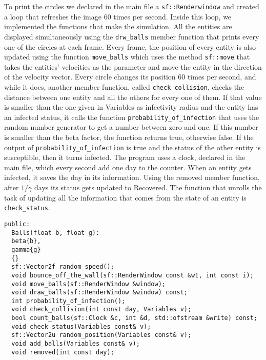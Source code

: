   To print the circles we declared in the main file a \verb|sf::Renderwindow| and created a loop that refreshes the image 60 times per second. Inside this loop, we implemented the functions that make the simulation. All the entities are displayed simultaneously using the \verb|drw_balls| member function that prints every one of the circles at each frame.
  Every frame, the position of every entity is also updated using the function \verb|move_balls| which uses the method \verb|sf::move| that takes the entities' velocities as the parameter and move the entity in the direction of the velocity vector. Every circle changes its position 60 times per second, and while it does, another member function, called \verb|check_collision|, checks the distance between one entity and all the others for every one of them. If that value is smaller than the one given in Variables as infectivity radius and the entity has an infected status, it calls the function \verb|probability_of_infection| that uses the random number generator to get a number between zero and one. If this number is smaller than the beta factor, the function returns true, otherwise false. If the output of \verb|probability_of_infection| is true and the status of the other entity is susceptible, then it turns infected. The program uses a clock, declared in the main file, which every second add one day to the counter. When an entity gets infected, it saves the day in its information. Using the removed member function, after $1/\gamma$ days its status gets updated to Recovered. The function that unrolls the task of updating all the information that comes from the state of an entity is \verb|check_status|.
  \begin{verbatim}
public:
  Balls(float b, float g):
  beta{b},
  gamma{g}
  {}
  sf::Vector2f random_speed();
  void bounce_off_the_wall(sf::RenderWindow const &w1, int const i);
  void move_balls(sf::RenderWindow &window);
  void draw_balls(sf::RenderWindow &window) const;
  int probability_of_infection();
  void check_collision(int const day, Variables v);
  bool count_balls(sf::Clock &c, int &d, std::ofstream &write) const;
  void check_status(Variables const& v);
  sf::Vector2u random_position(Variables const& v);
  void add_balls(Variables const& v);
  void removed(int const day);
  \end{verbatim}

